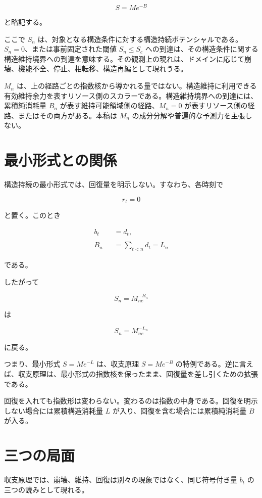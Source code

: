\documentclass[12pt,a4paper]{article}
\begin{document}
\[
S = M e^{-B}
\]

と略記する。

ここで \(S_{n}\) は、対象となる構造条件に対する構造持続ポテンシャルである。\(S_{n}=0\)、または事前固定された閾値 \(S_{n}\le S_{c}\) への到達は、その構造条件に関する構造維持境界への到達を意味する。その観測上の現れは、ドメインに応じて崩壊、機能不全、停止、相転移、構造再編として現れうる。

\(M_{n}\) は、上の経路ごとの指数核から導かれる量ではない。構造維持に利用できる有効維持余力を表すリソース側のスカラーである。構造維持境界への到達には、累積純消耗量 \(B_{n}\) が表す維持可能領域側の経路、\(M_{n}=0\) が表すリソース側の経路、またはその両方がある。本稿は \(M_{n}\) の成分分解や普遍的な予測力を主張しない。

\section{最小形式との関係}\label{ux6700ux5c0fux5f62ux5f0fux3068ux306eux95a2ux4fc2}

構造持続の最小形式では、回復量を明示しない。すなわち、各時刻で

\[
r_{t}=0
\]

と置く。このとき

\[
\begin{aligned}
b_{t}&=d_{t}, \\
\qquad \\
B_{n}&=\sum_{t<n}d_{t}=L_{n}
\end{aligned}
\]

である。

したがって

\[
S_{n}=M_{ne}^{-B_{n}}
\]

は

\[
S_{n}=M_{ne}^{-L_{n}}
\]

に戻る。

つまり、最小形式 \(S=Me^{-L}\) は、収支原理 \(S=Me^{-B}\) の特例である。逆に言えば、収支原理は、最小形式の指数核を保ったまま、回復量を差し引くための拡張である。

回復を入れても指数形は変わらない。変わるのは指数の中身である。回復を明示しない場合には累積構造消耗量 \(L\) が入り、回復を含む場合には累積純消耗量 \(B\) が入る。

\section{三つの局面}\label{ux4e09ux3064ux306eux5c40ux9762}

収支原理では、崩壊、維持、回復は別々の現象ではなく、同じ符号付き量 \(b_{t}\) の三つの読みとして現れる。
\end{document}
